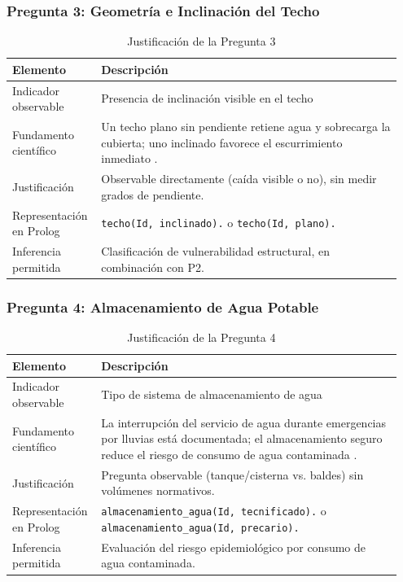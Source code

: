 \documentclass[12pt, letterpaper]{article}
\begin{document}
\subsubsection*{Pregunta 3: Geometría e Inclinación del Techo}
\begin{table}[H]
\centering
\caption{Justificación de la Pregunta 3}
\label{tab:p3}
\begin{tabular}{@{}p{0.2\linewidth}p{0.75\linewidth}@{}}
\toprule
\textbf{Elemento} & \textbf{Descripción} \\ \midrule
Indicador observable & Presencia de inclinación visible en el techo \\
Fundamento científico & Un techo plano sin pendiente retiene agua y sobrecarga la cubierta; uno inclinado favorece el escurrimiento inmediato \parencite{typsa_drenaje}. \\
Justificación & Observable directamente (caída visible o no), sin medir grados de pendiente. \\
Representación en Prolog & \texttt{techo(Id, inclinado).} o \texttt{techo(Id, plano).} \\
Inferencia permitida & Clasificación de vulnerabilidad estructural, en combinación con P2. \\ \bottomrule
\end{tabular}
\end{table}

\subsubsection*{Pregunta 4: Almacenamiento de Agua Potable}
\begin{table}[H]
\centering
\caption{Justificación de la Pregunta 4}
\label{tab:p4}
\begin{tabular}{@{}p{0.2\linewidth}p{0.75\linewidth}@{}}
\toprule
\textbf{Elemento} & \textbf{Descripción} \\ \midrule
Indicador observable & Tipo de sistema de almacenamiento de agua \\
Fundamento científico & La interrupción del servicio de agua durante emergencias por lluvias está documentada; el almacenamiento seguro reduce el riesgo de consumo de agua contaminada \parencite{geresa_sala}. \\
Justificación & Pregunta observable (tanque/cisterna vs. baldes) sin volúmenes normativos. \\
Representación en Prolog & \texttt{almacenamiento\_agua(Id, tecnificado).} o \texttt{almacenamiento\_agua(Id, precario).} \\
Inferencia permitida & Evaluación del riesgo epidemiológico por consumo de agua contaminada. \\ \bottomrule
\end{tabular}
\end{table}
\end{document}
